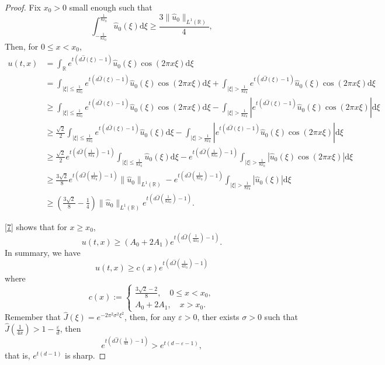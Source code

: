 \documentclass[10pt,a4paper]{amsart}
\newcommand{\R}{\mathbb{R}}
\newcommand{\dd}{\mathrm{d}}
\begin{document}
\begin{proof}
 Fix \(x_0>0\) small enough such that
 \begin{equation*}
 	\int_{-\frac{1}{8x_0}}^{\frac{1}{8x_0}}\hat{u}_0(\xi)\dd \xi\geq \frac{3\|\hat{u}_0\|_{L^1(\R)}}{4},
 \end{equation*}
 Then, for \(0\leq x<x_0 \),
 \begin{align*}
 	u(t,x) &= \int_{\mathbb{R}} e^{t(d\hat{J}(\xi)-1)}\hat{u}_0(\xi)\cos(2\pi x \xi)\dd \xi \\
 	&= \int_{|\xi|\leq \frac{1}{8x_0}} e^{t(d\hat{J}(\xi)-1)}\hat{u}_0(\xi)\cos(2\pi x \xi)\dd \xi+ \int_{|\xi|> \frac{1}{8x_0}} e^{t(d\hat{J}(\xi)-1)}\hat{u}_0(\xi)\cos(2\pi x \xi)\dd \xi\\
 	&\geq \int_{|\xi|\leq \frac{1}{8x_0}} e^{t(d\hat{J}(\xi)-1)}\hat{u}_0(\xi)\cos(2\pi x \xi)\dd \xi-\int_{|\xi|> \frac{1}{8x_0}}\left|  e^{t(d\hat{J}(\xi)-1)}\hat{u}_0(\xi)\cos(2\pi x \xi)\right| \dd \xi\\
 	&\geq \frac{\sqrt{2}}{2}\int_{|\xi|\leq \frac{1}{8x_0}} e^{t(d\hat{J}(\xi)-1)}\hat{u}_0(\xi)\dd \xi-\int_{|\xi|> \frac{1}{8x_0}}\left|  e^{t(d\hat{J}(\xi)-1)}\hat{u}_0(\xi)\cos(2\pi x \xi)\right| \dd \xi\\
 	&\geq \frac{\sqrt{2}}{2}e^{t(d\hat{J}(\frac{1}{8x_0})-1)}\int_{|\xi|\leq \frac{1}{8x_0}} \hat{u}_0(\xi)\dd \xi-e^{t(d\hat{J}(\frac{1}{8x_0})-1)}\int_{|\xi|> \frac{1}{8x_0}}\left| \hat{u}_0(\xi)\cos(2\pi x \xi)\right| \dd \xi\\
 	&\geq \frac{3\sqrt{2}}{8}e^{t(d\hat{J}(\frac{1}{8x_0})-1)} \|\hat{u}_0\|_{L^1(\R)}-e^{t(d\hat{J}(\frac{1}{8x_0})-1)}\int_{|\xi|> \frac{1}{8x_0}}\left| \hat{u}_0(\xi)\right| \dd \xi\\
 	&\geq \left( \frac{3\sqrt{2}}{8}-\frac{1}{4}\right)\|\hat{u}_0\|_{L^1(\R)}e^{t(d\hat{J}(\frac{1}{8x_0})-1)} .
 \end{align*}
 
 \eqref{7} shows that for \(x\geq x_0\), 
 \[u(t,x)\geq (A_0 + 2A_1)e^{t(d\hat{J}(\frac{1}{4x_0})-1)}.\] 
 In summary, we have
 \[u(t,x)\geq c(x)e^{t(d\hat{J}(\frac{1}{4x_0})-1)}\]
 where
 \[c(x)  :=  \left\{ \begin{array}{l}
 	\frac{{3\sqrt 2-2 }}{8},\quad 0 \le x < {x_0},\\
 	{A_0} + 2{A_1},\quad x > {x_0}.
 \end{array} \right.\]
Remember that \(\hat{J}(\xi)=e^{-2\pi^2 \sigma^2\xi^2}\), then, for any \(\varepsilon > 0\), ther exists \(\sigma > 0\) such that \(\hat{J}\left(\frac{1}{4x}\right) > 1 - \frac{\varepsilon}{d}\), then
 \[e^{t(d\hat{J}(\frac{1}{4x})-1)} >e^{t(d-\varepsilon-1)},\]
  that is, \(e^{t(d-1)}\) is sharp.
\end{proof} 
\end{document}

